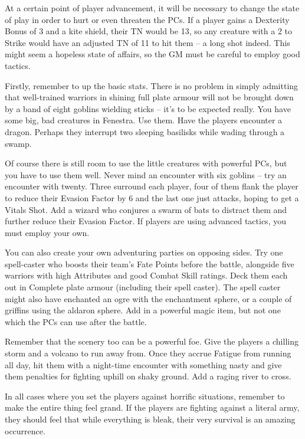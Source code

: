 \begin{multicols}{2}
At a certain point of player advancement, it will be necessary to change the state of play in order to hurt or even threaten the PCs.  If a player gains a Dexterity Bonus of 3 and a kite shield, their TN would be 13, so any creature with a 2 to Strike would have an adjusted TN of 11 to hit them -- a long shot indeed.  This might seem a hopeless state of affairs, so the GM must be careful to employ good tactics.

Firstly, remember to up the basic stats.  There is no problem in simply admitting that well-trained warriors in shining full plate armour will not be brought down by a band of eight goblins wielding sticks -- it's to be expected really.  You have some big, bad creatures in Fenestra.  Use them.  Have the players encounter a dragon.  Perhaps they interrupt two sleeping basilisks while wading through a swamp.

Of course there is still room to use the little creatures with powerful PCs, but you have to use them well.  Never mind an encounter with six goblins -- try an encounter with twenty.  Three surround each player, four of them flank the player to reduce their Evasion Factor by 6 and the last one just attacks, hoping to get a Vitals Shot.  Add a wizard who conjures a swarm of bats to distract them and further reduce their Evasion Factor.  If players are using advanced tactics, you must employ your own.

You can also create your own adventuring parties on opposing sides.  Try one spell-caster who boosts their team's Fate Points before the battle, alongside five warriors with high Attributes and good Combat Skill ratings.  Deck them each out in Complete plate armour (including their spell caster).  The spell caster might also have enchanted an ogre with the enchantment sphere, or a couple  of griffins using the aldaron sphere.  Add in a powerful magic item, but not one which the PCs can use after the battle.

Remember that the scenery too can be a powerful foe.  Give the players a chilling storm and a volcano to run away from.  Once they accrue Fatigue from running all day, hit them with a night-time encounter with something nasty and give them penalties for fighting uphill on shaky ground.  Add a raging river to cross.

In all cases where you set the players against horrific situations, remember to make the entire thing feel grand.  If the players are fighting against a literal army, they should feel that while everything is bleak, their very survival is an amazing occurrence.

\end{multicols}

